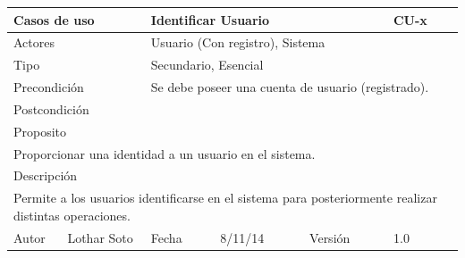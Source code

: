 \documentclass{article}
\begin{document}
\begin{table}[h]
\begin{tabular}{|l|l|l|l|l|l|}
\hline
\multicolumn{2}{|p{2cm}|}{Casos de uso}  & \multicolumn{3}{p{7cm}|}{Identificar Usuario} & CU-x \\
\hline
\multicolumn{2}{|p{2cm}|}{Actores}       & \multicolumn{4}{p{8cm}|}{Usuario (Con registro), Sistema}        \\
\hline
\multicolumn{2}{|p{2cm}|}{Tipo}          & \multicolumn{4}{p{8cm}|}{Secundario, Esencial}        \\
\hline
\multicolumn{2}{|p{2cm}|}{Precondición}  & \multicolumn{4}{p{8cm}|}{Se debe poseer una cuenta de usuario (registrado).}        \\
\hline
\multicolumn{2}{|p{2cm}|}{Postcondición} & \multicolumn{4}{p{8cm}|}{}        \\
\hline
\multicolumn{6}{|p{10cm}|}{Proposito}                                   \\
\hline
\multicolumn{6}{|p{10cm}|}{Proporcionar una identidad a un usuario en el sistema.}                                            \\
\hline
\multicolumn{6}{|p{10cm}|}{Descripción}                                 \\
\hline
\multicolumn{6}{|p{10cm}|}{Permite a los usuarios identificarse en el sistema para posteriormente realizar distintas operaciones.}                                            \\
\hline
Autor          &       Lothar Soto        & Fecha    &  8/11/14   &   Versión  & 1.0\\    
\hline
\end{tabular}
\end{table}




\end{document}
